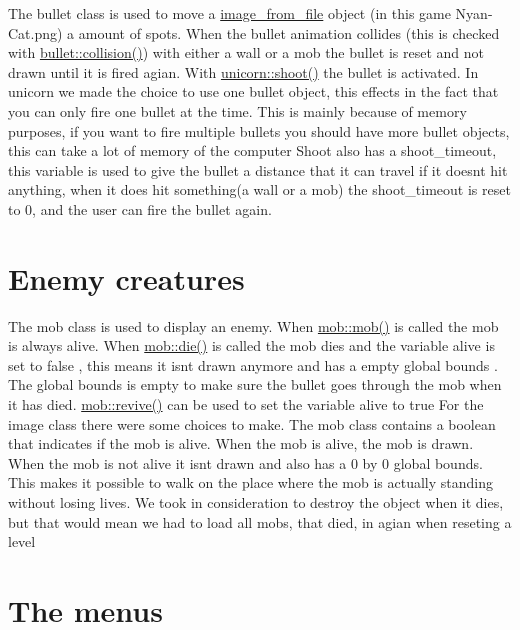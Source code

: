 The bullet class is used to move a \hyperlink{classimage__from__file}{image\+\_\+from\+\_\+file} object (in this game Nyan-\/\+Cat.\+png) a amount of spots. When the bullet animation collides (this is checked with \hyperlink{classbullet_ab7e5c677bbd642df24a2251bb58249b7}{bullet\+::collision()}) with either a wall or a mob the bullet is reset and not drawn until it is fired agian. With \hyperlink{classunicorn_af448a3fa5fc5f09254b50afa151ce42b}{unicorn\+::shoot()} the bullet is activated. In unicorn we made the choice to use one bullet object, this effects in the fact that you can only fire one bullet at the time. This is mainly because of memory purposes, if you want to fire multiple bullets you should have more bullet objects, this can take a lot of memory of the computer Shoot also has a shoot\+\_\+timeout, this variable is used to give the bullet a distance that it can travel if it doesn\textquotesingle{}t hit anything, when it does hit something(a wall or a mob) the shoot\+\_\+timeout is reset to 0, and the user can fire the bullet again.\hypertarget{index_mob}{}\section{Enemy creatures}\label{index_mob}
The mob class is used to display an enemy. When \hyperlink{classmob_ac524dd40986df00721239b66c552437e}{mob\+::mob()} is called the mob is always alive. When \hyperlink{classmob_ae892b3ce84f4aa16411b385abb5410c8}{mob\+::die()} is called the mob dies and the variable alive is set to false , this means it isn\textquotesingle{}t drawn anymore and has a empty global bounds . The global bounds is empty to make sure the bullet goes through the mob when it has died. \hyperlink{classmob_a3bce6c06653881f8be86fbc60a2b67cb}{mob\+::revive()} can be used to set the variable alive to true For the image class there were some choices to make. The mob class contains a boolean that indicates if the mob is alive. When the mob is alive, the mob is drawn. When the mob is not alive it isn\textquotesingle{}t drawn and also has a 0 by 0 global bounds. This makes it possible to walk on the place where the mob is actually standing without losing lives. We took in consideration to destroy the object when it dies, but that would mean we had to load all mobs, that died, in agian when reseting a level\hypertarget{index_menu}{}\section{The menu\textquotesingle{}s}\label{index_menu}
